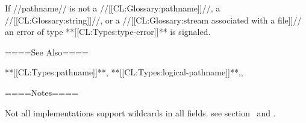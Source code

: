 If //pathname// is not a //[[CL:Glossary:pathname]]//, a //[[CL:Glossary:string]]//, or a //[[CL:Glossary:stream associated with a file]]// an error of type **[[CL:Types:type-error]]** is signaled.

====See Also====

**[[CL:Types:pathname]]**, **[[CL:Types:logical-pathname]]**,{\secref\FileSystemConcepts},

{\secref\PathnamesAsFilenames}

====Notes====

Not all implementations support wildcards in all fields. see section {\secref\WildComponents}\ and \secref\WildcardRestrictions.


   
